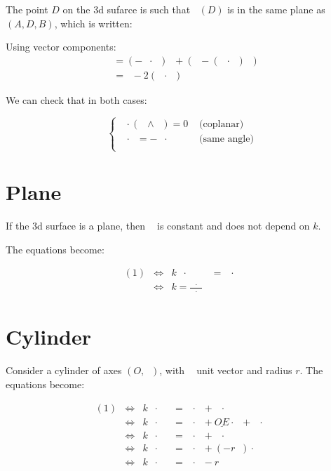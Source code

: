 \documentclass[10pt,a4paper]{article}
\newcommand{\ud}[1]{\underline{#1}}
\DeclareMathOperator{\cross}{\wedge}
\DeclareMathOperator{\AC}{\ud{AC}}
\DeclareMathOperator{\AO}{\ud{AO}}
\DeclareMathOperator{\OD}{\ud{OD}}
\DeclareMathOperator{\ED}{\ud{ED}}
\DeclareMathOperator{\eA}{\ud{e}_A}
\DeclareMathOperator{\eB}{\ud{e}_B}
\DeclareMathOperator{\n}{\ud{n}}
\DeclareMathOperator{\z}{\ud{z}}
\begin{document}
The point $D$ on the 3d sufarce is such that $\n(D)$ is in the same plane as
$(A, D, B)$, which is written:

Using vector components:
$$
\begin{array}{lll}
    \eB
    & = (-\eA\cdot\n) \n + \left( \eA - (\eA \cdot \n)\n \right)\\
    & = \eA - 2(\eA\cdot\n) \n
\end{array}
$$

We can check that in both cases:

$$
\left\{
\begin{array}{lll}
    \eB \cdot (\eA \cross \n) = 0 & \text{  (coplanar)}\\
    \eB \cdot \n = -\eA \cdot \n & \text{  (same angle)}\\
\end{array}
\right.
$$


\newpage
\section{Plane}

If the 3d surface is a plane, then $\n$ is constant and does not depend on $k$.

The equations become:

$$
\begin{array}{llll}
    (1)
    & \Leftrightarrow &
    k\eA\cdot\n
    & = \AC\cdot\n\\
    & \Leftrightarrow &
    k = \frac{\AC\cdot\n}{\eA\cdot\n}
\end{array}
$$


\newpage
\section{Cylinder}

Consider a cylinder of axes $(O, \z)$, with $\z$  unit vector and radius $r$.
The equations become:

$$
\begin{array}{llll}
    (1)
    & \Leftrightarrow &
    k\eA\cdot\n
    & = \AO\cdot\n + \OD\cdot \n\\
    & \Leftrightarrow &
    k\eA\cdot\n
    & = \AO\cdot\n + \ud{OE}\cdot \n + \ED \cdot \n\\
    & \Leftrightarrow &
    k\eA\cdot\n
    & = \AO\cdot\n + \ED \cdot \n\\
    & \Leftrightarrow &
    k\eA\cdot\n
    & = \AO\cdot\n + (-r\n) \cdot \n\\
    & \Leftrightarrow &
    k\eA\cdot\n
    & = \AO\cdot\n - r\\
\end{array}
$$
\end{document}
